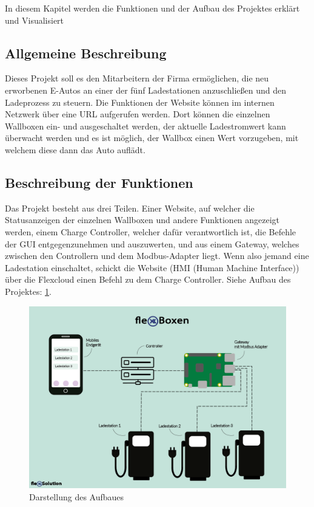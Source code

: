 In diesem Kapitel werden die Funktionen und der Aufbau des Projektes erklärt und Visualisiert


\subsection{Allgemeine  Beschreibung}

Dieses Projekt soll es den Mitarbeitern der Firma ermöglichen, die neu erworbenen E-Autos an einer der fünf Ladestationen anzuschließen und den Ladeprozess zu steuern. Die Funktionen der Website können im internen Netzwerk über eine URL aufgerufen werden. Dort können die einzelnen Wallboxen ein- und ausgeschaltet werden, der aktuelle Ladestromwert kann überwacht werden und es ist möglich, der Wallbox einen Wert vorzugeben, mit welchem diese dann das Auto auflädt.

\subsection{Beschreibung der Funktionen}  \label{AufbauDesProjektesWallbox}
Das Projekt besteht aus drei Teilen. Einer Website, auf welcher die Statusanzeigen der einzelnen Wallboxen und andere Funktionen angezeigt werden, einem Charge Controller, welcher dafür verantwortlich ist, die Befehle der GUI entgegenzunehmen und auszuwerten, und aus einem Gateway, welches zwischen den Controllern und dem Modbus-Adapter liegt. Wenn also jemand eine Ladestation einschaltet, schickt die Website (HMI (Human Machine Interface)) über die Flexcloud einen Befehl zu dem Charge Controller.
Siehe Aufbau des Projektes: \ref{fig:impl:Infografik_FlexBoxen}.

\begin{figure}[h t]
  \centering
  \includegraphics[scale=0.7]{pics/Infografik_FlexBoxen2.png}
  \caption{Darstellung des Aufbaues}
  \label{fig:impl:Infografik_FlexBoxen}
\end{figure}


